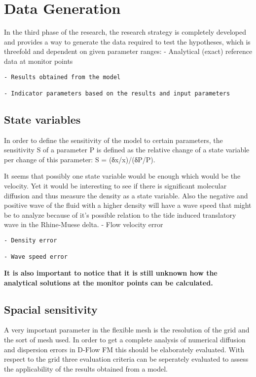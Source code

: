 \chapter{Data Generation}\label{data-generation}

In the third phase of the research, the research strategy is completely
developed and provides a way to generate the data required to test the
hypotheses, which is threefold and dependent on given parameter ranges:
- Analytical (exact) reference data at monitor points

\begin{verbatim}
- Results obtained from the model

- Indicator parameters based on the results and input parameters
\end{verbatim}

\section{State variables}\label{state-variables}

In order to define the sensitivity of the model to certain parameters,
the sensitivity S of a parameter P is defined as the relative change of
a state variable per change of this parameter: S = (δx/x)/(δP/P).

It seems that possibly one state variable would be enough which would be
the velocity. Yet it would be interesting to see if there is significant
molecular diffusion and thus measure the density as a state variable.
Also the negative and positive wave of the fluid with a higher density
will have a wave speed that might be to analyze because of it's possible
relation to the tide induced translatory wave in the Rhine-Muese delta.
- Flow velocity error

\begin{verbatim}
- Density error

- Wave speed error
\end{verbatim}

\textbf{It is also important to notice that it is still unknown how the
analytical solutions at the monitor points can be calculated.}

\section{Spacial sensitivity}\label{spacial-sensitivity}

A very important parameter in the flexible mesh is the resolution of the
grid and the sort of mesh used. In order to get a complete analysis of
numerical diffusion and dispersion errors in D-Flow FM this should be
elaborately evaluated. With respect to the grid three evaluation
criteria can be seperately evaluated to assess the applicability of the
results obtained from a model.

